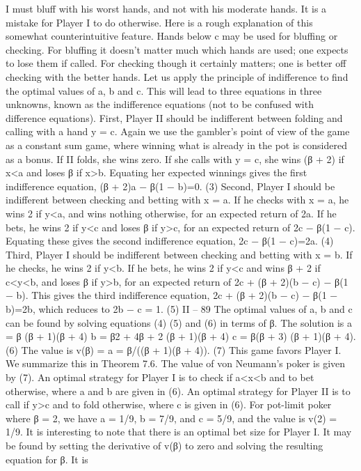 I must bluff with his worst hands, and not with his moderate hands. It is a mistake for
Player I to do otherwise. Here is a rough explanation of this somewhat counterintuitive
feature. Hands below c may be used for bluffing or checking. For bluffing it doesn’t matter
much which hands are used; one expects to lose them if called. For checking though it
certainly matters; one is better off checking with the better hands.
Let us apply the principle of indifference to find the optimal values of a, b and c. This
will lead to three equations in three unknowns, known as the indifference equations (not
to be confused with difference equations). First, Player II should be indifferent between
folding and calling with a hand y = c. Again we use the gambler’s point of view of the
game as a constant sum game, where winning what is already in the pot is considered as
a bonus. If II folds, she wins zero. If she calls with y = c, she wins (β + 2) if x<a and
loses β if x>b. Equating her expected winnings gives the first indifference equation,
(β + 2)a − β(1 − b)=0. (3)
Second, Player I should be indifferent between checking and betting with x = a. If
he checks with x = a, he wins 2 if y<a, and wins nothing otherwise, for an expected
return of 2a. If he bets, he wins 2 if y<c and loses β if y>c, for an expected return of
2c − β(1 − c). Equating these gives the second indifference equation,
2c − β(1 − c)=2a. (4)
Third, Player I should be indifferent between checking and betting with x = b. If he
checks, he wins 2 if y<b. If he bets, he wins 2 if y<c and wins β + 2 if c<y<b, and
loses β if y>b, for an expected return of 2c + (β + 2)(b − c) − β(1 − b). This gives the
third indifference equation,
2c + (β + 2)(b − c) − β(1 − b)=2b,
which reduces to
2b − c = 1. (5)
II – 89
The optimal values of a, b and c can be found by solving equations (4) (5) and (6) in
terms of β. The solution is
a = β
(β + 1)(β + 4) b = β2 + 4β + 2
(β + 1)(β + 4) c = β(β + 3)
(β + 1)(β + 4). (6)
The value is
v(β) = a = β/((β + 1)(β + 4)). (7)
This game favors Player I. We summarize this in
Theorem 7.6. The value of von Neumann’s poker is given by (7). An optimal strategy
for Player I is to check if a<x<b and to bet otherwise, where a and b are given in (6).
An optimal strategy for Player II is to call if y>c and to fold otherwise, where c is given
in (6).
For pot-limit poker where β = 2, we have a = 1/9, b = 7/9, and c = 5/9, and the
value is v(2) = 1/9.
It is interesting to note that there is an optimal bet size for Player I. It may be found
by setting the derivative of v(β) to zero and solving the resulting equation for β. It is
